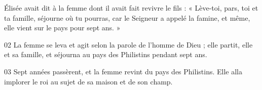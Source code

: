 Élisée avait dit à la femme dont il avait fait revivre le fils : « Lève-toi, pars, toi et ta famille, séjourne où tu pourras, car le Seigneur a appelé la famine, et même, elle vient sur le pays pour sept ans. »

02 La femme se leva et agit selon la parole de l’homme de Dieu ; elle partit, elle et sa famille, et séjourna au pays des Philistins pendant sept ans.

03 Sept années passèrent, et la femme revint du pays des Philistins. Elle alla implorer le roi au sujet de sa maison et de son champ.
